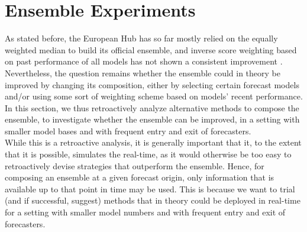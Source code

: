\section{Ensemble Experiments}
As stated before, the European Hub has so far mostly relied on the equally weighted median to build its official ensemble, and inverse score weighting based on past performance of all models has not shown a consistent improvement \cite{sherratt_predictive_2022}. Nevertheless, the question remains whether the ensemble could in theory be improved by changing its composition, either by selecting certain forecast models and/or using some sort of weighting scheme based on models' recent performance.\\
In this section, we thus retroactively analyze alternative methods to compose the ensemble, to investigate whether the ensemble can be improved, in a setting with smaller model bases and with frequent entry and exit of forecasters.\\
While this is a retroactive analysis, it is generally important that it, to the extent that it is possible, simulates the real-time, as it would otherwise be too easy to retroactively devise strategies that outperform the ensemble. Hence, for composing an ensemble at a given forecast origin, only information that is available up to that point in time may be used. This is because we want to trial (and if successful, suggest) methods that in theory could be deployed in real-time for a setting with smaller model numbers and with frequent entry and exit of forecasters. \\
